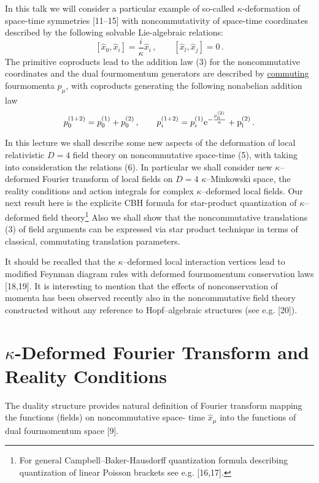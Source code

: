 \documentclass[a4paper,a4paper]{article}
\newcommand\E{\rm e}
\begin{document}
In this talk
 we
 will consider a particular example of
so-called $\kappa$-deformation of space-time symmetries [11--15]
with noncommutativity of space-time coordinates described by
the  following solvable Lie-algebraic  relations:
\begin{equation}
\left[ {\hat{x}}_{0}, {\hat{x}}_{i} \right] = 
\frac{i}{ \kappa} {\hat{x}}_{i}\, ,
\qquad
\left[ {\hat{x}}_{l}, {\hat{x}}_{j} \right] = 0\, .
\end{equation}
The primitive coproducts lead to the
   addition law (3) for the
noncommutative coordinates 
and the dual fourmomentum generators are described by 
\underline{commuting} fourmomenta $p_{\mu}$, with 
  coproducts generating the following nonabelian 
 addition law 
\begin{equation}
p_{0}^{(1+2)} = p_{0}^{(1)} + p_{0}^{(2)}\, ,
\qquad
p_{i}^{(1+2)}= p_{i}^{(1)}\E^{-{p_{0}^{(2)}\over \kappa}} +
p_{i}^{(2)}\, .
\end{equation}

In this lecture  we shall describe some new aspects of 
 the deformation of local
relativistic $D=4$ field theory on noncommutative space-time
(5), with taking into consideration the relations (6). 
In particular we shall consider new $\kappa$--deformed Fourier
transform of local fields on $D=4$ $\kappa$--Minkowski space,
the reality conditions and action integrals for
complex $\kappa$--deformed local fields. Our next result here is
the explicite CBH formula for star-product quantization of
$\kappa$--deformed field theory\footnote{For general
Campbell--Baker-Hausdorff quantization formula describing
quantization of linear Poisson brackets see e.g. [16,17].} 
Also we shall show that the noncommutative translations (3) of
field arguments can be expressed via 
 star product technique in terms of classical, commutating
translation parameters.

It should be recalled that the $\kappa$--deformed local
interaction vertices lead to modified Feynman diagram rules with
deformed fourmomentum conservation laws [18,19]. It is
interesting to mention that the effects of nonconservation of
momenta has been observed recently also in the noncommutative
field theory constructed
  without any reference to Hopf--algebraic structures
(see e.g. [20]).


\section{$\kappa$-Deformed Fourier Transform and Reality 
Conditions}
The duality structure provides natural definition of Fourier
transform mapping the functions (fields) on noncommutative space-
time
$\hat{x}_{\mu}$ into the functions of dual fourmomentum space [9].
\end{document}
